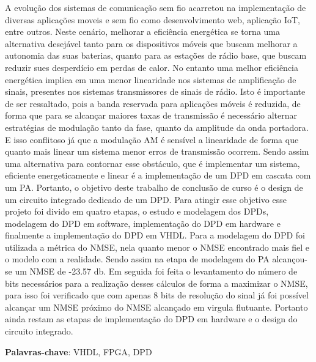 A evolução dos sistemas de comunicação sem fio acarretou na implementação de diversas aplicações moveis e sem fio como desenvolvimento web, aplicação IoT, entre outros. Neste cenário, melhorar a eficiência energética se torna uma alternativa desejável tanto para os dispositivos móveis que buscam melhorar a autonomia das suas baterias, quanto para as estações de rádio base, que buscam reduzir sues desperdício em perdas de calor. No entanto uma melhor eficiência energética implica em uma menor linearidade nos sistemas de amplificação de sinais, presentes nos sistemas transmissores de sinais de rádio. Isto é importante de ser ressaltado, pois a banda reservada para aplicações móveis é reduzida, de forma que para se alcançar maiores taxas de transmissão é necessário alternar estratégias de modulação tanto da fase, quanto da amplitude da onda portadora. E isso conflitoso já que a modulação AM é sensível a linearidade de forma que quanto mais linear um sistema menor erros de transmissão ocorrem. Sendo assim uma alternativa para contornar esse obstáculo, que é implementar um sistema, eficiente energeticamente e linear é a implementação de um DPD em cascata com um PA. Portanto, o objetivo deste trabalho de conclusão de curso é o design de um circuito integrado dedicado de um DPD. Para atingir esse objetivo esse projeto foi divido em quatro etapas, o estudo e modelagem dos DPDs, modelagem do DPD em software, implementação do DPD em hardware e finalmente a implementação do DPD em VHDL. Para a modelagem do DPD foi utilizada a métrica do NMSE, nela quanto menor o NMSE encontrado mais fiel e o modelo com a realidade. Sendo assim na etapa de modelagem do PA alcançou-se um NMSE de -23.57 db. Em seguida foi feita o levantamento do número de bits necessários para a realização desses cálculos de forma a maximizar o NMSE, para isso foi verificado que com apenas 8 bits de resolução do sinal já foi possível alcançar um NMSE próximo do NMSE alcançado em virgula flutuante. Portanto ainda restam as etapas de implementação do DPD em hardware e o design do circuito integrado. 

\textbf{Palavras-chave}: VHDL, FPGA, DPD 